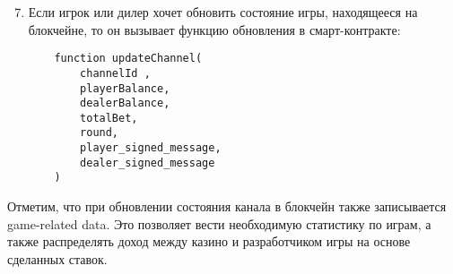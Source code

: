 \begin{algorithm}
\begin{enumerate}
\setcounter{enumi}{6}
 \item Если игрок или дилер хочет обновить состояние игры, находящееся на блокчейне, то он вызывает функцию обновления в смарт-контракте:
\begin{lstlisting}
    function updateChannel(
        channelId ,
        playerBalance,
        dealerBalance,
        totalBet,
        round,
        player_signed_message,
        dealer_signed_message
    )
\end{lstlisting}
\end{enumerate}
\end{algorithm}

Отметим, что при обновлении состояния канала в блокчейн также записывается game-related data. Это позволяет вести необходимую статистику по играм, а также распределять доход между казино и разработчиком игры на основе сделанных ставок.

